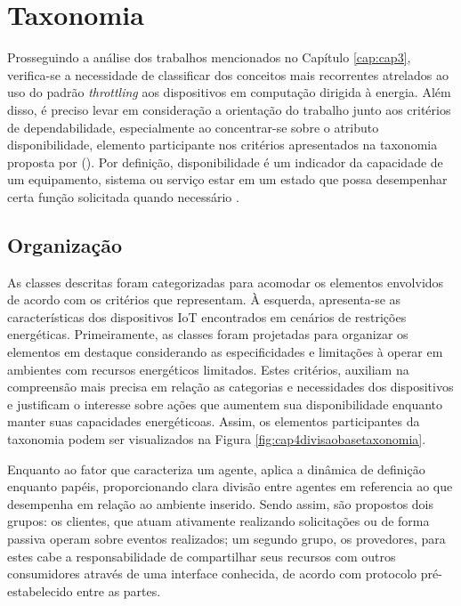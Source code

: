 \chapter{Taxonomia}
\label{cap:cap4}

Prosseguindo a análise dos trabalhos mencionados no Capítulo \ref{cap:cap3}, verifica-se a necessidade de classificar dos conceitos mais recorrentes atrelados ao uso do padrão \textit{throttling} aos dispositivos em computação dirigida à energia. Além disso, é preciso levar em consideração a orientação do trabalho junto aos critérios de dependabilidade, especialmente ao concentrar-se sobre o atributo disponibilidade, elemento participante nos critérios apresentados na taxonomia proposta por \citeauthor{avizienis_basic_2004} (\citeyear{avizienis_basic_2004}). Por definição,  disponibilidade é um indicador da capacidade de um equipamento, sistema ou serviço estar em um estado que possa desempenhar certa função solicitada quando necessário \cite{ISO9000}. 

\section{Organização}

As classes descritas foram categorizadas para acomodar os elementos envolvidos de acordo com os critérios que representam. À esquerda, apresenta-se as características dos dispositivos \acs{IoT} encontrados em cenários de restrições energéticas. Primeiramente, as classes foram projetadas para organizar os elementos em destaque considerando as especificidades e limitações à operar em ambientes com recursos energéticos limitados. Estes critérios, auxiliam na compreensão mais precisa em relação as categorias e necessidades dos dispositivos e justificam o interesse sobre ações que aumentem sua disponibilidade enquanto manter suas capacidades energéticoas. Assim, os elementos participantes da taxonomia podem ser visualizados na Figura \ref{fig:cap4divisaobasetaxonomia}. 

Enquanto ao fator que caracteriza um agente,  aplica a dinâmica de definição enquanto papéis, proporcionando clara divisão entre agentes em referencia ao que desempenha em relação ao ambiente inserido. Sendo assim, são propostos dois grupos: os clientes, que atuam ativamente realizando solicitações ou de forma passiva operam sobre  eventos realizados;  um segundo grupo, os provedores, para estes cabe a responsabilidade de compartilhar seus recursos com outros consumidores através de uma interface conhecida, de acordo com protocolo pré-estabelecido entre as partes.


